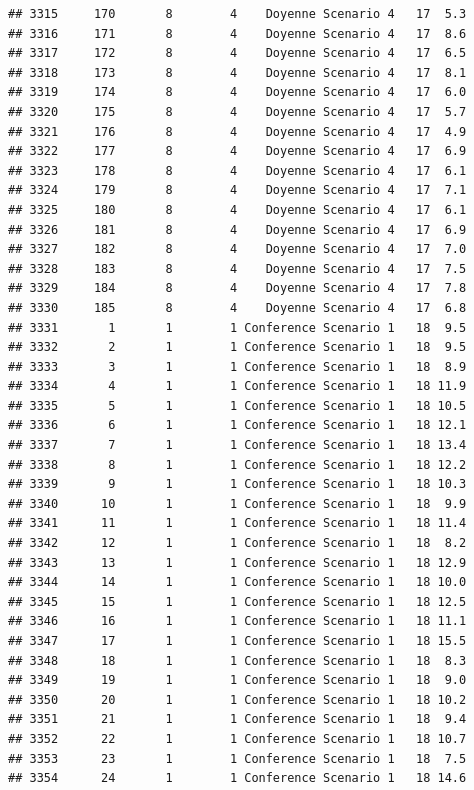 \documentclass[
]{article}
\begin{document}
\begin{verbatim}
## 3315     170       8        4    Doyenne Scenario 4   17  5.3
## 3316     171       8        4    Doyenne Scenario 4   17  8.6
## 3317     172       8        4    Doyenne Scenario 4   17  6.5
## 3318     173       8        4    Doyenne Scenario 4   17  8.1
## 3319     174       8        4    Doyenne Scenario 4   17  6.0
## 3320     175       8        4    Doyenne Scenario 4   17  5.7
## 3321     176       8        4    Doyenne Scenario 4   17  4.9
## 3322     177       8        4    Doyenne Scenario 4   17  6.9
## 3323     178       8        4    Doyenne Scenario 4   17  6.1
## 3324     179       8        4    Doyenne Scenario 4   17  7.1
## 3325     180       8        4    Doyenne Scenario 4   17  6.1
## 3326     181       8        4    Doyenne Scenario 4   17  6.9
## 3327     182       8        4    Doyenne Scenario 4   17  7.0
## 3328     183       8        4    Doyenne Scenario 4   17  7.5
## 3329     184       8        4    Doyenne Scenario 4   17  7.8
## 3330     185       8        4    Doyenne Scenario 4   17  6.8
## 3331       1       1        1 Conference Scenario 1   18  9.5
## 3332       2       1        1 Conference Scenario 1   18  9.5
## 3333       3       1        1 Conference Scenario 1   18  8.9
## 3334       4       1        1 Conference Scenario 1   18 11.9
## 3335       5       1        1 Conference Scenario 1   18 10.5
## 3336       6       1        1 Conference Scenario 1   18 12.1
## 3337       7       1        1 Conference Scenario 1   18 13.4
## 3338       8       1        1 Conference Scenario 1   18 12.2
## 3339       9       1        1 Conference Scenario 1   18 10.3
## 3340      10       1        1 Conference Scenario 1   18  9.9
## 3341      11       1        1 Conference Scenario 1   18 11.4
## 3342      12       1        1 Conference Scenario 1   18  8.2
## 3343      13       1        1 Conference Scenario 1   18 12.9
## 3344      14       1        1 Conference Scenario 1   18 10.0
## 3345      15       1        1 Conference Scenario 1   18 12.5
## 3346      16       1        1 Conference Scenario 1   18 11.1
## 3347      17       1        1 Conference Scenario 1   18 15.5
## 3348      18       1        1 Conference Scenario 1   18  8.3
## 3349      19       1        1 Conference Scenario 1   18  9.0
## 3350      20       1        1 Conference Scenario 1   18 10.2
## 3351      21       1        1 Conference Scenario 1   18  9.4
## 3352      22       1        1 Conference Scenario 1   18 10.7
## 3353      23       1        1 Conference Scenario 1   18  7.5
## 3354      24       1        1 Conference Scenario 1   18 14.6

\end{verbatim}
\end{document}
